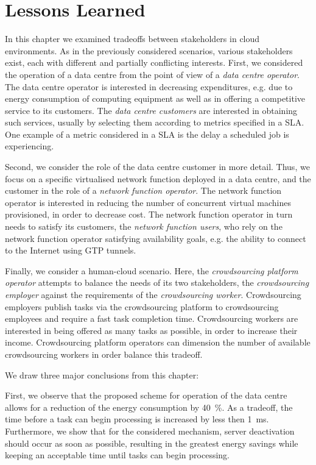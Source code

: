 \section{Lessons Learned}\label{sec:cloud:lessons_learned}
In this chapter we examined tradeoffs between stakeholders in cloud environments.
As in the previously considered scenarios, various stakeholders exist, each with different and partially conflicting interests.
First, we considered the operation of a data centre from the point of view of a \emph{data centre operator}.
The data centre operator is interested in decreasing expenditures, e.g. due to energy consumption of computing equipment as well as in offering a competitive service to its customers.
The \emph{data centre customers} are interested in obtaining such services, usually by selecting them according to metrics specified in a \gls{SLA}.
One example of a metric considered in a \gls{SLA} is the delay a scheduled job is experiencing.

Second, we consider the role of the data centre customer in more detail.
Thus, we focus on a specific virtualised network function deployed in a data centre, and the customer in the role of a \emph{network function operator}.
The network function operator is interested in reducing the number of concurrent virtual machines provisioned, in order to decrease cost.
The network function operator in turn needs to satisfy its customers, the \emph{network function users}, who rely on the network function operator satisfying availability goals, e.g. the ability to connect to the Internet using \gls{GTP} tunnels.

Finally, we consider a human-cloud scenario.
Here, the \emph{crowdsourcing platform operator} attempts to balance the needs of its two stakeholders, the \emph{crowdsourcing employer} against the requirements of the \emph{crowdsourcing worker}.
Crowdsourcing employers publish tasks via the crowdsourcing platform to crowdsourcing employees and require a fast task completion time.
Crowdsourcing workers are interested in being offered as many tasks as possible, in order to increase their income.
Crowdsourcing platform operators can dimension the number of available crowdsourcing workers in order balance this tradeoff.

We draw three major conclusions from this chapter:

First, we observe that the proposed scheme for operation of the data centre allows for a reduction of the energy consumption by \SI{40}{\percent}.
As a tradeoff, the time before a task can begin processing is increased by less then \SI{1}{\milli\second}.
Furthermore, we show that for the considered mechanism, server deactivation should occur as soon as possible, resulting in the greatest energy savings while keeping an acceptable time until tasks can begin processing.

